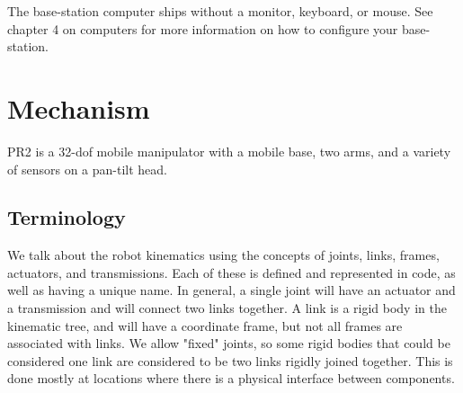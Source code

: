 The base-station computer ships
without a monitor, keyboard, or mouse.  See chapter 4 on computers for more information on how to configure your base-station.

\section{Mechanism}
PR2 is a 32-dof mobile manipulator with a mobile base, two arms, and a variety
of sensors on a pan-tilt head.

\subsection{Terminology}
We talk about the robot kinematics using the concepts of joints, links, frames,
actuators, and transmissions.  Each of these is defined and represented in code,
as well as having a unique name.  In general, a single joint will have an
actuator and a transmission and will connect two links together.  A link is a
rigid body in the kinematic tree, and will have a coordinate frame, but not all
frames are associated with links.  We allow "fixed" joints, so some rigid bodies
that could be considered one link are considered to be two links rigidly joined
together.  This is done mostly at locations where there is a physical interface
between components.

